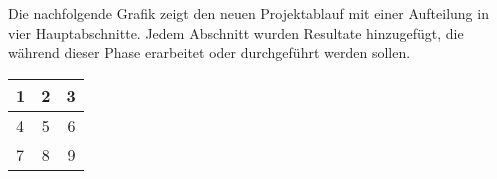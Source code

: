 Die nachfolgende Grafik zeigt den neuen Projektablauf 
mit einer Aufteilung in vier Hauptabschnitte. Jedem Abschnitt wurden Resultate
hinzugefügt, die während dieser Phase erarbeitet oder durchgeführt werden sollen.


\begin{center}
  \begin{tabular}{ l | c | r | }
    \hline
    1 & 2 & 3 \\ \hline
    4 & 5 & 6 \\ \hline
    7 & 8 & 9 \\
    \hline
  \end{tabular}
\end{center}